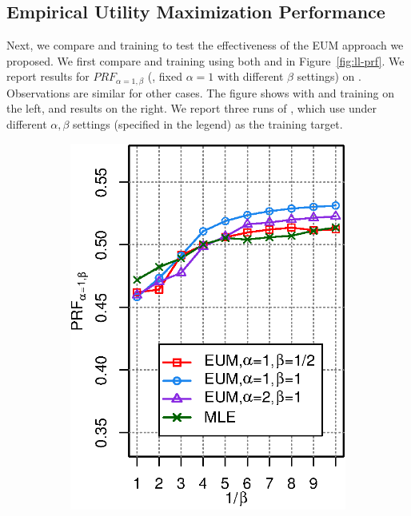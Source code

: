 \subsection{Empirical Utility Maximization Performance}
Next, we compare \EUM  and \MLE training to test the effectiveness of the EUM approach we proposed. We first compare \EUM and \MLE training using both \QFI and \QFJ in Figure~\ref{fig:ll-prf}. We report results for $P\!R\!F_{\alpha=1,\beta}$ (\ie, fixed $\alpha=1$ with different $\beta$ settings) on \DQF. Observations are similar for other cases. The figure shows \QFI with \EUM and \MLE training on the left, and \QFJ results on the right. We report three runs of \EUM, which use \PRF under different $\alpha,\beta$  settings (specified in the legend) as the training target.


\begin{figure}[H]
\centering
\caption{$P\!R\!F_{\alpha=1,\beta}$ performance for \MLE and \EUM training using \QFI (left) and \QFJ (right) on \DQF. The three \EUM runs use \PRF under different $\alpha,\beta$ settings (specified in the legend) as the training target.}
\label{fig:ll-prf}
\begin{subfigure}[b]{0.45\columnwidth}
\includegraphics[width=\columnwidth]{figure/qf13-qfi-prfaf-ll-prf.eps}

\end{subfigure}
\end{figure}
